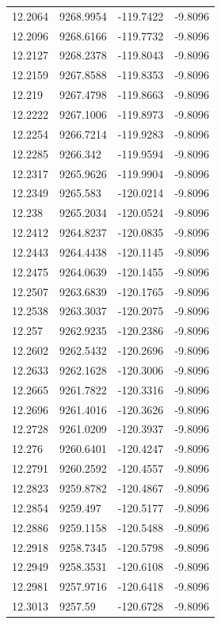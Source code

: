 \begin{table}[H]
\begin{tabular}{llll}
12.2064 & 9268.9954 & -119.7422 & -9.8096 \\
12.2096 & 9268.6166 & -119.7732 & -9.8096 \\
12.2127 & 9268.2378 & -119.8043 & -9.8096 \\
12.2159 & 9267.8588 & -119.8353 & -9.8096 \\
12.219 & 9267.4798 & -119.8663 & -9.8096 \\
12.2222 & 9267.1006 & -119.8973 & -9.8096 \\
12.2254 & 9266.7214 & -119.9283 & -9.8096 \\
12.2285 & 9266.342 & -119.9594 & -9.8096 \\
12.2317 & 9265.9626 & -119.9904 & -9.8096 \\
12.2349 & 9265.583 & -120.0214 & -9.8096 \\
12.238 & 9265.2034 & -120.0524 & -9.8096 \\
12.2412 & 9264.8237 & -120.0835 & -9.8096 \\
12.2443 & 9264.4438 & -120.1145 & -9.8096 \\
12.2475 & 9264.0639 & -120.1455 & -9.8096 \\
12.2507 & 9263.6839 & -120.1765 & -9.8096 \\
12.2538 & 9263.3037 & -120.2075 & -9.8096 \\
12.257 & 9262.9235 & -120.2386 & -9.8096 \\
12.2602 & 9262.5432 & -120.2696 & -9.8096 \\
12.2633 & 9262.1628 & -120.3006 & -9.8096 \\
12.2665 & 9261.7822 & -120.3316 & -9.8096 \\
12.2696 & 9261.4016 & -120.3626 & -9.8096 \\
12.2728 & 9261.0209 & -120.3937 & -9.8096 \\
12.276 & 9260.6401 & -120.4247 & -9.8096 \\
12.2791 & 9260.2592 & -120.4557 & -9.8096 \\
12.2823 & 9259.8782 & -120.4867 & -9.8096 \\
12.2854 & 9259.497 & -120.5177 & -9.8096 \\
12.2886 & 9259.1158 & -120.5488 & -9.8096 \\
12.2918 & 9258.7345 & -120.5798 & -9.8096 \\
12.2949 & 9258.3531 & -120.6108 & -9.8096 \\
12.2981 & 9257.9716 & -120.6418 & -9.8096 \\
12.3013 & 9257.59 & -120.6728 & -9.8096 \\

\end{tabular}
\end{table}
